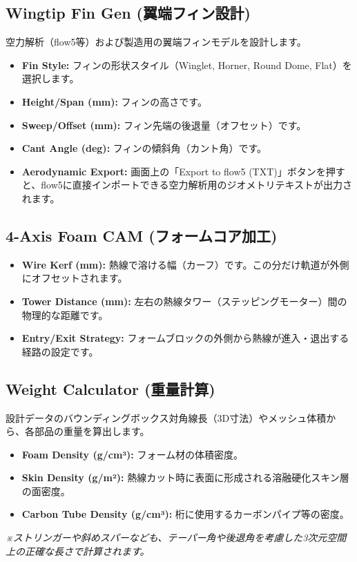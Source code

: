 \documentclass[11pt,a4paper]{ltjsarticle}
\begin{document}
\subsection{Wingtip Fin Gen (翼端フィン設計)}
空力解析（flow5等）および製造用の翼端フィンモデルを設計します。
\begin{itemize}
    \item \textbf{Fin Style:} フィンの形状スタイル（Winglet, Horner, Round Dome, Flat）を選択します。
    \item \textbf{Height/Span (mm):} フィンの高さです。
    \item \textbf{Sweep/Offset (mm):} フィン先端の後退量（オフセット）です。
    \item \textbf{Cant Angle (deg):} フィンの傾斜角（カント角）です。
    \item \textbf{Aerodynamic Export:} 画面上の「Export to flow5 (TXT)」ボタンを押すと、flow5に直接インポートできる空力解析用のジオメトリテキストが出力されます。
\end{itemize}

\subsection{4-Axis Foam CAM (フォームコア加工)}
\begin{itemize}
    \item \textbf{Wire Kerf (mm):} 熱線で溶ける幅（カーフ）です。この分だけ軌道が外側にオフセットされます。
    \item \textbf{Tower Distance (mm):} 左右の熱線タワー（ステッピングモーター）間の物理的な距離です。
    \item \textbf{Entry/Exit Strategy:} フォームブロックの外側から熱線が進入・退出する経路の設定です。
\end{itemize}

\subsection{Weight Calculator (重量計算)}
設計データのバウンディングボックス対角線長（3D寸法）やメッシュ体積から、各部品の重量を算出します。
\begin{itemize}
    \item \textbf{Foam Density (g/cm³):} フォーム材の体積密度。
    \item \textbf{Skin Density (g/m²):} 熱線カット時に表面に形成される溶融硬化スキン層の面密度。
    \item \textbf{Carbon Tube Density (g/cm³):} 桁に使用するカーボンパイプ等の密度。
\end{itemize}
\textit{※ストリンガーや斜めスパーなども、テーパー角や後退角を考慮した3次元空間上の正確な長さで計算されます。}
\end{document}
